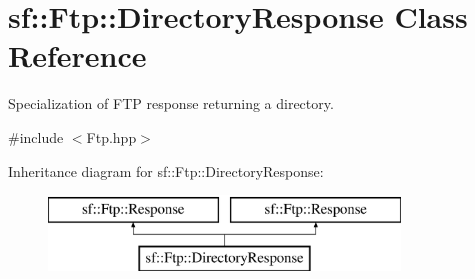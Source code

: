 \hypertarget{classsf_1_1_ftp_1_1_directory_response}{\section{sf\-:\-:Ftp\-:\-:Directory\-Response Class Reference}
\label{classsf_1_1_ftp_1_1_directory_response}
}


Specialization of F\-T\-P response returning a directory.  




{\ttfamily \#include $<$Ftp.\-hpp$>$}

Inheritance diagram for sf\-:\-:Ftp\-:\-:Directory\-Response\-:\begin{figure}[H]
\begin{center}
\leavevmode
\includegraphics[height=2.000000cm]{classsf_1_1_ftp_1_1_directory_response}
\end{center}
\end{figure}
